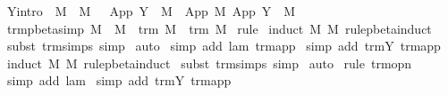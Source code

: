 \begin{isabellebody}
{\isacharbar}\ Y{\isacharbrackleft}intro{\isacharbrackright}{\isacharcolon}\ {\isachardoublequoteopen}{\isasymlbrakk}\ M\ {\isasymggreater}\ M{\isacharprime}\ {\isasymrbrakk}\ {\isasymLongrightarrow}\ App\ {\isacharparenleft}Y\ {\isasymsigma}{\isacharparenright}\ M\ {\isasymggreater}\ App\ M{\isacharprime}\ {\isacharparenleft}App\ {\isacharparenleft}Y\ {\isasymsigma}{\isacharparenright}\ M{\isacharprime}{\isacharparenright}{\isachardoublequoteclose}\isanewline
\isanewline
{}\isamarkupfalse%
\ trm{\isacharunderscore}pbeta{\isacharunderscore}simp{}{\isacharcolon}\ {\isachardoublequoteopen}M\ {\isasymggreater}\ M{\isacharprime}\ {\isasymLongrightarrow}\ trm\ M\ {\isasymand}\ trm\ M{\isacharprime}{\isachardoublequoteclose}\isanewline
%
\isadelimproof
%
\endisadelimproof
%
\isatagproof
{}\isamarkupfalse%
\ rule\isanewline
{}\isamarkupfalse%
\ {\isacharparenleft}induct\ M\ M{\isacharprime}\ rule{\isacharcolon}pbeta{\isachardot}induct{\isacharparenright}\isanewline
{}\isamarkupfalse%
\ {\isacharparenleft}subst\ trm{\isachardot}simps{\isacharcomma}\ simp{\isacharparenright}{\isacharplus}\isanewline
{}\isamarkupfalse%
\ auto{\isacharbrackleft}{}{\isacharbrackright}\isanewline
{}\isamarkupfalse%
\ {\isacharparenleft}simp\ add{\isacharcolon}\ lam\ trm{\isachardot}app{\isacharparenright}\isanewline
{}\isamarkupfalse%
\ {\isacharparenleft}simp\ add{\isacharcolon}\ trm{\isachardot}Y\ trm{\isachardot}app{\isacharparenright}\isanewline
{}\isamarkupfalse%
\ {\isacharparenleft}induct\ M\ M{\isacharprime}\ rule{\isacharcolon}pbeta{\isachardot}induct{\isacharparenright}\isanewline
{}\isamarkupfalse%
\ {\isacharparenleft}subst\ trm{\isachardot}simps{\isacharcomma}\ simp{\isacharparenright}{\isacharplus}\isanewline
{}\isamarkupfalse%
\ auto{\isacharbrackleft}{}{\isacharbrackright}\isanewline
{}\isamarkupfalse%
\ {\isacharparenleft}rule\ trm{\isacharunderscore}opn{\isacharparenright}\isanewline
{}\isamarkupfalse%
\ {\isacharparenleft}simp\ add{\isacharcolon}\ lam{\isacharparenright}\isanewline
{}\isamarkupfalse%
\ {\isacharparenleft}simp\ add{\isacharcolon}\ trm{\isachardot}Y\ trm{\isachardot}app{\isacharparenright}\isanewline
{}\isamarkupfalse%
%
\endisatagproof
{\isafoldproof}%
%
\isadelimproof
%
\endisadelimproof
%
\isamarkuptrue%
\isamarkupfalse%

\end{isabellebody}
